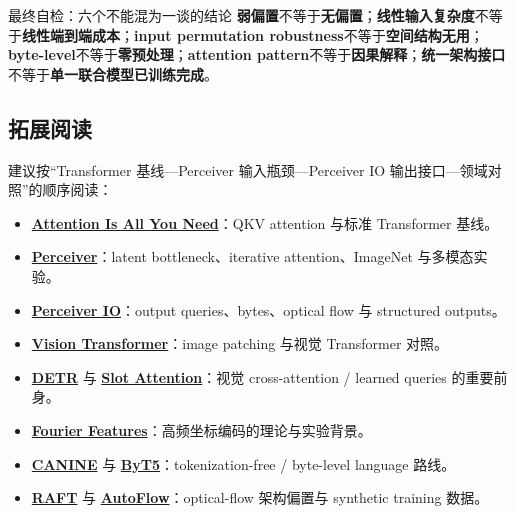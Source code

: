 \begin{warningbox}{最终自检：六个不能混为一谈的结论}
\textbf{弱偏置}不等于\textbf{无偏置}；\textbf{线性输入复杂度}不等于\textbf{线性端到端成本}；\textbf{input permutation robustness}不等于\textbf{空间结构无用}；\textbf{byte-level}不等于\textbf{零预处理}；\textbf{attention pattern}不等于\textbf{因果解释}；\textbf{统一架构接口}不等于\textbf{单一联合模型已训练完成}。
\end{warningbox}

\subsection{拓展阅读}

建议按“Transformer 基线—Perceiver 输入瓶颈—Perceiver IO 输出接口—领域对照”的顺序阅读：

{\small
\begin{itemize}[nosep,leftmargin=*]
  \item \href{https://arxiv.org/abs/1706.03762}{\textbf{Attention Is All You Need}}：QKV attention 与标准 Transformer 基线。
  \item \href{https://arxiv.org/abs/2103.03206}{\textbf{Perceiver}}：latent bottleneck、iterative attention、ImageNet 与多模态实验。
  \item \href{https://arxiv.org/abs/2107.14795}{\textbf{Perceiver IO}}：output queries、bytes、optical flow 与 structured outputs。
  \item \href{https://arxiv.org/abs/2010.11929}{\textbf{Vision Transformer}}：image patching 与视觉 Transformer 对照。
  \item \href{https://arxiv.org/abs/2005.12872}{\textbf{DETR}} 与 \href{https://arxiv.org/abs/2006.15055}{\textbf{Slot Attention}}：视觉 cross-attention / learned queries 的重要前身。
  \item \href{https://arxiv.org/abs/2006.10739}{\textbf{Fourier Features}}：高频坐标编码的理论与实验背景。
  \item \href{https://arxiv.org/abs/2103.06874}{\textbf{CANINE}} 与 \href{https://arxiv.org/abs/2105.13626}{\textbf{ByT5}}：tokenization-free / byte-level language 路线。
  \item \href{https://arxiv.org/abs/2003.12039}{\textbf{RAFT}} 与 \href{https://arxiv.org/abs/2104.14544}{\textbf{AutoFlow}}：optical-flow 架构偏置与 synthetic training 数据。
\end{itemize}
}


